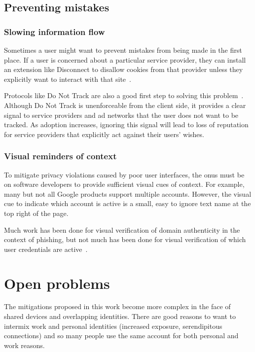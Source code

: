 \documentclass{llncs}
\begin{document}
\begin{comment}
\cite{viegas}blogger's expectation of privacy
\end{comment}

\subsection{Preventing mistakes}
\subsubsection{Slowing information flow}
Sometimes a user might want to prevent mistakes from being made in the first
place. If a user is concerned about a particular service provider, they can
install an extension like Disconnect to disallow cookies from that provider
unless they explicitly want to interact with that site~\cite{disconnect}.

Protocols like Do Not Track are also a good first step to solving this
problem~\cite{dnt}. Although Do Not Track is unenforceable from the client
side, it provides a clear signal to service providers and ad networks
that the user does not want to be tracked. As adoption increases, ignoring this
signal will lead to loss of reputation for service providers that explicitly
act against their users' wishes.

\subsubsection{Visual reminders of context}
To mitigate privacy violations caused by poor user interfaces, the onus must be
on software developers to provide sufficient visual cues of context. For
example, many but not all Google products support multiple accounts. However,
the visual cue to indicate which account is active is a small, easy to ignore
text name at the top right of the page.

Much work has been done for visual verification of domain authenticity in the
context of phishing, but not much has been done for visual verification of
which user credentials are active~\cite{skins}.

\begin{comment}
first party regrets, third party regrets
impossible to judge how big friends of friends
\end{comment}

\section{Open problems}
The mitigations proposed in this work become more complex in the face of shared
devices and overlapping identities. There are good reasons to want to intermix
work and personal identities (increased exposure, serendipitous connections)
and so many people use the same account for both personal and work reasons.
\end{document}
